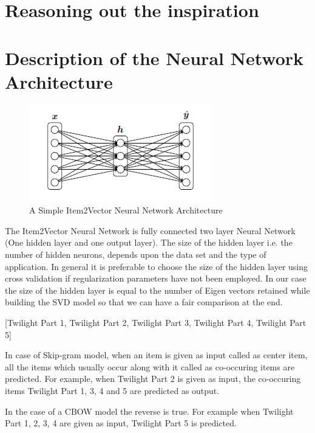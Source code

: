\section{Reasoning out the inspiration}


\section{Description of the Neural Network Architecture}
\begin{figure}
  \centering
  \includegraphics{2_1_NN_Architecture}
  \caption{A Simple Item2Vector Neural Network Architecture}
  \label{fig:2_1_NN_Architecture}
\end{figure}

 The Item2Vector Neural Network is fully connected two layer Neural Network (One hidden layer and one output layer). The size of the hidden layer i.e. the number of hidden neurons, depends upon the data set and the type of application. In general it is preferable to choose the size of the hidden layer using cross validation if regularization parameters have not been employed. In our case the size of the hidden layer is equal to the number of Eigen vectors retained while building the SVD model so that we can have a fair comparison at the end.



\begin{center}
[Twilight Part 1, Twilight Part 2, Twilight Part 3, Twilight Part 4, Twilight Part 5]
\end{center}

In case of Skip-gram model, when an item is given as input called as center item, all the items which usually occur along with it called as co-occuring items are predicted. For example, when Twilight Part 2 is given as input, the co-occuring items Twilight Part 1, 3, 4 and 5 are predicted as output. 

In the case of a CBOW model the reverse is true. For example when Twilight Part 1, 2, 3, 4 are given as input, Twilight Part 5 is predicted. 

